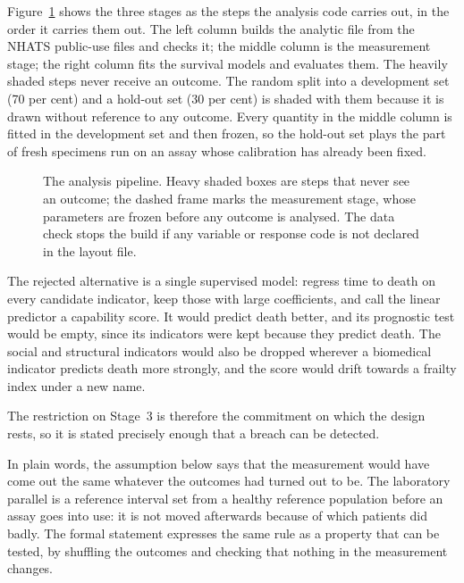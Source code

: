 Figure~\ref{fig:methods-pipeline} shows the three stages as the steps the analysis code carries out, in the order it carries them out. The left column builds the analytic file from the NHATS public-use files and checks it; the middle column is the measurement stage; the right column fits the survival models and evaluates them. The heavily shaded steps never receive an outcome. The random split into a development set (70 per cent) and a hold-out set (30 per cent) is shaded with them because it is drawn without reference to any outcome. Every quantity in the middle column is fitted in the development set and then frozen, so the hold-out set plays the part of fresh specimens run on an assay whose calibration has already been fixed.

\begin{figure}[htbp]
\centering

\caption[The analysis pipeline]{The analysis pipeline. Heavy shaded boxes are steps that never see an outcome; the dashed frame marks the measurement stage, whose parameters are frozen before any outcome is analysed. The data check stops the build if any variable or response code is not declared in the layout file.}
\label{fig:methods-pipeline}
\end{figure}

The rejected alternative is a single supervised model: regress time to death on every candidate indicator, keep those with large coefficients, and call the linear predictor a capability score. It would predict death better, and its prognostic test would be empty, since its indicators were kept because they predict death. The social and structural indicators would also be dropped wherever a biomedical indicator predicts death more strongly, and the score would drift towards a frailty index under a new name.

The restriction on Stage~3 is therefore the commitment on which the design rests, so it is stated precisely enough that a breach can be detected.

In plain words, the assumption below says that the measurement would have come out the same whatever the outcomes had turned out to be. The laboratory parallel is a reference interval set from a healthy reference population before an assay goes into use: it is not moved afterwards because of which patients did badly. The formal statement expresses the same rule as a property that can be tested, by shuffling the outcomes and checking that nothing in the measurement changes.

